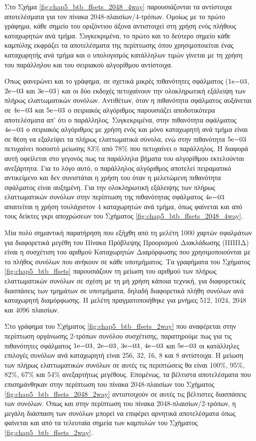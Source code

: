Στο Σχήμα \ref{fig:chap5_btb_ffsets_2048_4way} παρουσιάζονται τα αντίστοιχα αποτελέσματα για τον πίνακα 2048-πλαισίων/4-τρόπων. Ομοίως με το πρώτο γράφημα, κάθε σημείο του οριζόντιου άξονα αντιστοιχεί στη χρήση ενός πλήθους καταχωρητών ανά τμήμα. Συγκεκριμένα, το πρώτο και το δεύτερο σημείο κάθε καμπύλης εκφράζει τα αποτελέσματα της περίπτωσης όπου χρησιμοποιείται ένας καταχωρητής ανά τμήμα και ο υπολογισμός κατάλληλων τιμών γίνεται με τη χρήση του παράλληλου και του σειριακού αλγορίθμου αντίστοιχα.
\par
Όπως φανερώνει και το γράφημα, σε σχετικά μικρές πιθανότητες σφάλματος ($1\mathrm{e}{-03}$, $2\mathrm{e}{-03}$ και $3\mathrm{e}{-03}$) και οι δύο εκδοχές πετυχαίνουν την ολοκληρωτική εξάλειψη των πλήρως ελαττωματικών συνόλων. Αντιθέτων, όταν η πιθανότητα σφάλματος αυξάνεται σε $4\mathrm{e}{-03}$ και $5\mathrm{e}{-03}$ ο σειριακός αλγόριθμος παρουσιάζει αποδοτικότερα αποτελέσματα απ' ότι ο παράλληλος. Συγκεκριμένα, στην πιθανότητα σφάλματος $4\mathrm{e}{-03}$ ο σειριακός αλγόριθμος με χρήση ενός και μόνο καταχωρητή ανά τμήμα είναι σε θέση να εξαλείψει τα πλήρως ελαττωματικά σύνολα, ενώ στην πιθανότητα $5\mathrm{e}{-03}$ πετυχαίνει ποσοστό μείωσης 83\% από 78\% που πετυχαίνει ο παράλληλος. Η διαφορά αυτή οφείλεται στο γεγονός πως τα παράλληλα βήματα του αλγορίθμου εκτελούνται ανεξάρτητα. Για το λόγο αυτό, ο παράλληλος αλγόριθμος αποτελεί πειραματικό αντικείμενο και δεν συνιστάται η χρήση του όταν η μελετώμενη πιθανότητα σφάλματος είναι αυξημένη. Για την ολοκληρωτική εξάλειψης των πλήρως ελαττωματικών συνόλων στην περίπτωση της πιθανότητας σφάλματος $4\mathrm{e}{-03}$ απαιτείται η χρήση τουλάχιστον 4 καταχωρητών ανά τμήμα, όπως φαίνεται και από τους δείκτες γκρι αποχρώσεων του Σχήματος \ref{fig:chap5_btb_ffsets_2048_4way}.
\par
Μία πολύ σημαντική παρατήρηση που εξήχθη από τη μελέτη 1000 χαρτών σφαλμάτων για διαφορετικά μεγέθη του Πίνακα Πρόβλεψης Προορισμού Διακλάδωσης (ΠΠΠΔ) είναι η συσχέτιση του αριθμού Καταχωρητών Διαμόρφωσης που χρησιμοποιούνται με το πλήθος συνόλων που ανήκουν σε κάθε υποτμήματος. Τα γραφήματα του Σχήματος \ref{fig:chap5_btb_ffsets} παρουσιάζουν τη μείωση του αριθμού των πλήρως ελαττωματικών συνόλων σε σχέση με τη μή χρήση κάποια τεχνική, για διαφορετικές διασπάσεις των τμημάτων σε υποτμήματα, δηλαδή διαφορετικά πλήθη συνόλων ανά καταχωρητή διαμόρφωσης. Η μελέτη πραγματοποιήθηκε για μνήμες 512, 1024, 2048 και 4096 πλαισίων.
\par
Στο γράφημα του Σχήματος \ref{fig:chap5_btb_ffsets_2way} που αναφέρεται στην περίπτωση οργάνωσης 2-τρόπων συνόλου συσχέτισης, παρατηρούμε πως για τις πιθανότητες σφάλματος $1\mathrm{e}{-03}$, $2\mathrm{e}{-03}$, $3\mathrm{e}{-03}$, $4\mathrm{e}{-03}$ και $5\mathrm{e}{-03}$ οι κατάλληλες επιλογές συνόλων ανά καταχωρητή είναι 256, 32, 16, 8 και 8 αντίστοιχα. Η μείωση των πλήρως ελαττωματικών συνόλων σε αυτές τις περιπτώσεις θα είναι 100\%, 95\%, 82\%, 67\% και 54\% ανεξαρτήτως μεγέθους. Επομένως, τα βέλτιστα αποτελέσματα που επισημάνθηκαν στην περίπτωση του πίνακα 2048-πλαισίων του Σχήματος \ref{fig:chap5_btb_ffsets_2048_2way} αντιστοιχούν σε αυτές τις βέλτιστες διασπάσεις των συνόλων. Όπως και στην περίπτωση του πίνακα 2048-πλαισίων/2-τρόπων, η μεγάλη διάσπαση των συνόλων μπορεί να επιφέρει αρνητικά αποτελέσματα όπως φαίνεται και από τα τελευταία σημεία των καμπυλών του Σχήματος \ref{fig:chap5_btb_ffsets_2way}.
